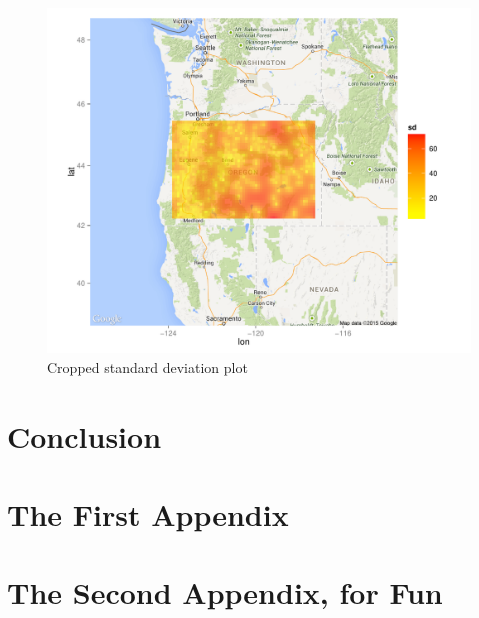 \documentclass[12pt,twoside]{reedthesis}
\begin{document}
\begin{figure}[h!]
	   
	       \centering
	  
	    \includegraphics[scale=0.7]{sd_crop}
	
	     \caption{Cropped standard deviation plot}
	 \label{sdcrop}
	\end{figure}
	

\chapter*{Conclusion}
	\setcounter{chapter}{4}
	\setcounter{section}{0}
	



    \appendix
      \chapter{The First Appendix}
      \chapter{The Second Appendix, for Fun}



  \backmatter %
\end{document}

